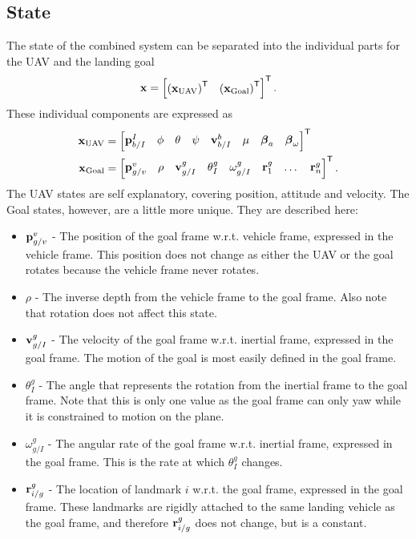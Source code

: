 \subsection{State}
The state of the combined system can be separated into the individual parts for
the UAV and the landing goal
\begin{equation}
  \boldsymbol{\mathrm{x}} =
  \begin{bmatrix}
    \left(\boldsymbol{\mathrm{x}}_{\text{UAV}}\right)^{\mathsf{T}} & \left(\boldsymbol{\mathrm{x}}_{\text{Goal}}\right)^{\mathsf{T}}
  \end{bmatrix}^{\mathsf{T}}.
\end{equation}
These individual components are expressed as
\begin{align}
  \boldsymbol{\mathrm{x}}_{\text{UAV}} &=
  \begin{bmatrix}
    \boldsymbol{\mathrm{p}}_{b/I}^I &
    \phi & \theta & \psi &
    \boldsymbol{\mathrm{v}}_{b/I}^b &
    \mu & \boldsymbol{\mathrm{\beta}}_a & \boldsymbol{\mathrm{\beta}}_\omega
  \end{bmatrix}^{\mathsf{T}} \\
  \boldsymbol{\mathrm{x}}_{\text{Goal}} & =
    \begin{bmatrix}
      \boldsymbol{\mathrm{p}}_{g/v}^{v} & \rho & \boldsymbol{\mathrm{v}}_{g/I}^{g} & \theta_{I}^{g} &
      \omega_{g/I}^{g} &
      \boldsymbol{\mathrm{r}}_{1}^{g} & \dots & \boldsymbol{\mathrm{r}}_{n}^{g}
    \end{bmatrix}^{\mathsf{T}}.
\end{align}
The UAV states are self explanatory, covering position, attitude and velocity.
The Goal states, however, are a little more unique. They are described here:
\begin{itemize}
  \item $\boldsymbol{\mathrm{p}}_{g/v}^{v}$ - The position of the goal frame w.r.t. vehicle
    frame, expressed in the vehicle frame. This position does not change as
    either the UAV or the goal rotates because the vehicle frame never rotates.
  \item $\rho$ - The inverse depth from the vehicle frame to the goal frame.
    Also note that rotation does not affect this state.
  \item $\boldsymbol{\mathrm{v}}_{g/I}^{g}$ - The velocity of the goal frame w.r.t. inertial
    frame, expressed in the goal frame. The motion of the goal is most easily
    defined in the goal frame.
  \item $\theta_I^g$ - The angle that represents the rotation from the inertial
    frame to the goal frame. Note that this is only one value as the goal frame
    can only yaw while it is constrained to motion on the plane.
  \item $\omega_{g/I}^g$ - The angular rate of the goal frame w.r.t. inertial
    frame, expressed in the goal frame. This is the rate at which $\theta_I^g$
    changes.
  \item $\boldsymbol{\mathrm{r}}_{i/g}^g$ - The location of landmark $i$ w.r.t. the goal frame,
    expressed in the goal frame. These landmarks are rigidly attached to the
    same landing vehicle as the goal frame, and therefore $\boldsymbol{\mathrm{r}}_{i/g}^g$
    does not change, but is a constant.
\end{itemize}

